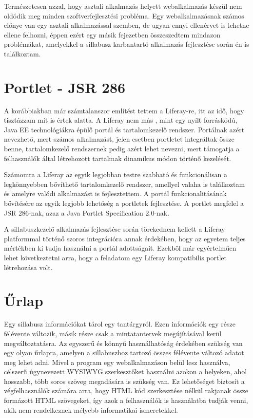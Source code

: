 \documentclass[hidelinks, 12pt, a4paper]{report}
\begin{document}
Természetesen azzal, hogy asztali alkalmazás helyett webalkalmazás készül nem oldódik meg minden szoftverfejlesztési probléma. Egy webalkalmazásnak számos előnye van egy asztali alkalmazással szemben, de ugyan ennyi ellenérvet is lehetne ellene felhozni, éppen ezért egy másik fejezetben összeszedtem mindazon problémákat, amelyekkel a sillabusz karbantartó alkalmazás fejlesztése során én is találkoztam.

\section{Portlet - JSR 286}

A korábbiakban már számtalanszor említést tettem a Liferay-re, itt az idő, hogy tisztázzam mit is értek alatta. A Liferay nem más \cite{liferay-in-action}, mint egy nyílt forráskódú, Java EE technológiákra épülő portál és tartalomkezelő rendszer. Portálnak azért nevezhető, mert számos alkalmazást, jelen esetben portletet integráltak össze benne, tartalomkezelő rendszernek pedig azért lehet nevezni, mert támogatja a felhasználók által létrehozott tartalmak dinamikus módon történő kezelését.

Számomra a Liferay az egyik legjobban testre szabható és funkcionálisan a legkönnyebben bővíthető tartalomkezelő rendszer, amellyel valaha is találkoztam és amelyre valódi alkalmazást is fejlesztettem. A portál funkcionalitásának bővítésére az egyik legjobb lehetőség a portletek fejlesztése. A portlet \cite{jsr286} megfelel a JSR 286-nak, azaz a Java Portlet Specification 2.0-nak.

A sillabuszkezelő alkalmazás fejlesztése során törekednem kellett a Liferay platformmal történő szoros integrációra annak érdekében, hogy az egyetem teljes mértékben ki tudja használni a portál adottságait. Ezekből már egyértelműen lehet következtetni arra, hogy a feladatom egy Liferay kompatibilis portlet létrehozása volt.

\section{Űrlap}

Egy sillabusz információkat tárol egy tantárgyról. Ezen információk egy része félévente változik, másik része csak a mintatantervek megújításával kerül megváltoztatásra. Az egyszerű és könnyű használhatóság érdekében szükség van egy olyan űrlapra, amelyen a sillabuszhoz tartozó összes félévente változó adatot meg lehet adni. Mivel a program egy webalkalmazáson belül lesz használva, célszerű úgynevezett \mbox{WYSIWYG}\footnotemark{} szerkesztőket használni azokon a helyeken, ahol hosszabb, több soros szöveg megadására is szükség van. Ez lehetőséget biztosít a végfelhasználók számára arra, hogy HTML kód szerkesztése nélkül rakjanak össze formázott HTML szövegeket, így azok a felhasználók is használatba tudják venni, akik nem rendelkeznek mélyebb informatikai ismeretekkel.
\end{document}
